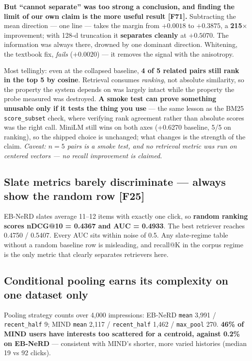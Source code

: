 \documentclass[10pt,a4paper]{article}
\newcommand{\F}[1]{\textcolor{blue!55!black}{\footnotesize[#1]}}
\begin{document}
\textbf{But ``cannot separate'' was too strong a conclusion, and finding the limit of our own claim
is the more useful result \F{F71}.} Subtracting the mean direction --- one line --- takes the margin
from $+0.0018$ to $\mathbf{+0.3875}$, a \textbf{215$\times$} improvement; with 128-d truncation it
\textbf{separates cleanly} at $+0.5070$. The information was always there, drowned by one dominant
direction. Whitening, the textbook fix, \emph{fails} ($+0.0020$) --- it removes the signal with the
anisotropy.

Most tellingly: even at the collapsed baseline, \textbf{4 of 5 related pairs still rank in the top 5
by cosine}. Retrieval consumes \emph{ranking}, not absolute similarity, so the property the system
depends on was largely intact while the property the probe measured was destroyed. \textbf{A smoke
test can prove something unusable only if it tests the thing you use} --- the same lesson as the
BM25 \texttt{score\_subset} check, where verifying rank agreement rather than absolute scores was
the right call. MiniLM still wins on both axes (+0.6270 baseline, 5/5 on ranking), so the shipped
choice is unchanged; what changes is the strength of the claim. \emph{Caveat: $n=5$ pairs is a smoke
test, and no retrieval metric was run on centered vectors --- no recall improvement is claimed.}

\subsection{Slate metrics barely discriminate --- always show the random row \F{F25}}

EB-NeRD slates average 11--12 items with exactly one click, so \textbf{random ranking scores
nDCG@10 = 0.4367 and AUC = 0.4933}. The best retriever reaches 0.4750 / 0.5407. Every AUC sits
within noise of 0.5. Any slate-regime table without a random baseline row is misleading, and
recall@K in the corpus regime is the only metric that clearly separates retrievers here.

\subsection{Conditional pooling earns its complexity on one dataset only}

Pooling strategy counts over 4,000 impressions: EB-NeRD \texttt{mean} 3,991 / \texttt{recent\_half}
9; MIND \texttt{mean} 2,117 / \texttt{recent\_half} 1,462 / \texttt{max\_pool} 270. \textbf{46\% of
MIND users have interests too scattered for a centroid, against 0.2\% on EB-NeRD} --- consistent
with MIND's shorter, more varied histories (median 19 vs 92 clicks).
\end{document}
